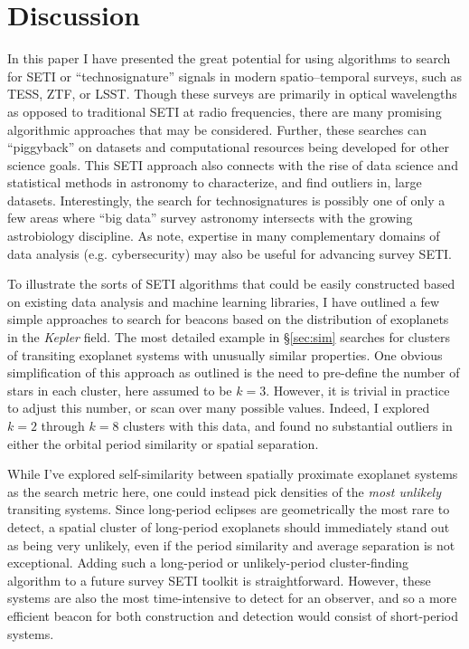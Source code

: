 \documentclass[twocolumn]{aastex62}
\newcommand{\Kepler}{\textsl{Kepler}\xspace}
\begin{document}
\section{Discussion}
\label{sec:discussion}

In this paper I have presented the great potential for using algorithms to search for SETI or ``technosignature'' signals in modern spatio--temporal surveys, such as TESS, ZTF, or LSST. Though these surveys are primarily in optical wavelengths as opposed to traditional SETI at radio frequencies, there are many promising algorithmic approaches that may be considered. Further, these searches can ``piggyback'' on datasets and computational resources being developed for other science goals.
This SETI approach also connects with the rise of data science and statistical methods in astronomy to characterize, and find outliers in, large datasets. Interestingly, the search for technosignatures is possibly one of only a few areas where ``big data'' survey astronomy intersects with the growing astrobiology discipline. As \citet{berea2019} note, expertise in many complementary domains of data analysis (e.g. cybersecurity) may also be useful for advancing survey SETI.


To illustrate the sorts of SETI algorithms that could be easily constructed based on existing data analysis and machine learning libraries, I have outlined a few simple approaches to search for beacons based on the distribution of exoplanets in the \Kepler field.
The most detailed example in \S\ref{sec:sim} searches for clusters of transiting exoplanet systems with unusually similar properties.
One obvious simplification of this approach as outlined is the need to pre-define the number of stars in each cluster, here assumed to be $k=3$. However, it is trivial in practice to adjust this number, or scan over many possible values. Indeed, I explored $k=2$ through $k=8$ clusters with this data, and found no substantial outliers in either the orbital period similarity or spatial separation.


While I've explored self-similarity between spatially proximate exoplanet systems as the search metric here, one could instead pick densities of the {\it most unlikely} transiting systems. Since long-period eclipses are geometrically the most rare to detect, a spatial cluster of long-period exoplanets should immediately stand out as being very unlikely, even if the period similarity and average separation is not exceptional. Adding such a long-period or unlikely-period cluster-finding algorithm to a future survey SETI toolkit is straightforward. However, these systems are also the most time-intensive to detect for an observer, and so a more efficient beacon for both construction and detection would consist of short-period systems. 
\end{document}
